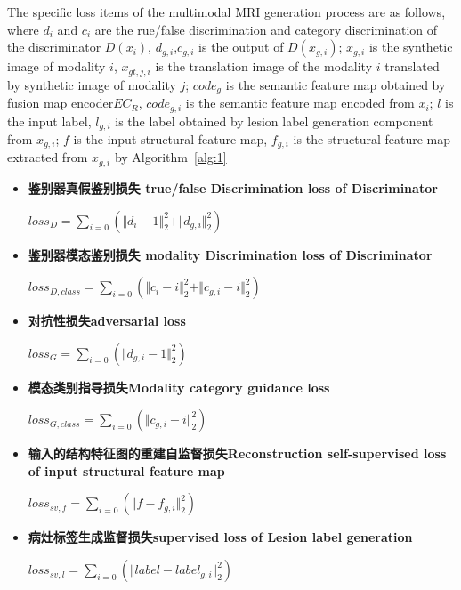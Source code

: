 \documentclass[letterpaper]{article} %
\begin{document}
The specific loss items of the multimodal MRI generation process are as follows, where $d_{i}$ and $c_{i}$ are the rue/false discrimination and category discrimination of the discriminator $D(x_i)$, $d_{g, i}$,$c_{g,i}$ is the output of $D(x_{g,i})$; $x_{g,i}$ is the synthetic image of modality $i$, $x_{gt,j,i}$ is the translation image of the modality $i$ translated by synthetic image of modality $j$; $code_g$ is the semantic feature map obtained by fusion map encoder$EC_R$, $code_{g,i}$ is the semantic feature map encoded from $x_i$; $l$ is the input label, $l_{g,i}$ is the label obtained by lesion label generation component from $x_{g,i}$; $f$ is the input structural feature map, $f_{g,i}$ is the structural feature map extracted from $x_{g,i}$ by Algorithm~\ref{alg:1}
\begin{itemize}
	\item \textbf{鉴别器真假鉴别损失 true/false Discrimination loss of Discriminator}
	\begin{center}
		$loss_{D}=\sum\limits_{i=0}(\Vert{d_{i}-1}\Vert_{2}^{2}+\Vert{d_{g,i}}\Vert_{2}^{2})$
	\end{center}

	\item \textbf{鉴别器模态鉴别损失 modality Discrimination loss of Discriminator}
	\begin{center}
	$loss_{D,class}=\sum\limits_{i=0}(\Vert{c_{i}-i}\Vert_{2}^{2}+\Vert{c_{g,i}-i}\Vert_{2}^{2})$
	\end{center}

	\item \textbf{对抗性损失adversarial loss}
	\begin{center}
		$loss_{G}=\sum\limits_{i=0}(\Vert{d_{g,i}-1}\Vert_{2}^{2})$
	\end{center}
	
	\item \textbf{模态类别指导损失Modality category guidance loss}
	\begin{center}
		$loss_{G,class}=\sum\limits_{i=0}(\Vert{c_{g,i}-i}\Vert_{2}^{2})$
	\end{center}
	
	\item \textbf{输入的结构特征图的重建自监督损失Reconstruction self-supervised loss of input structural feature map}
	\begin{center}
		$loss_{sv,f}=\sum\limits_{i=0}(\Vert{f-f_{g,i}}\Vert_{2}^{2})$
	\end{center}
	
	\item \textbf{病灶标签生成监督损失supervised loss of Lesion label generation }
	\begin{center}
		$loss_{sv,l}=\sum\limits_{i=0}(\Vert{label-label_{g,i}}\Vert_{2}^{2})$
	\end{center}
	

\end{itemize}
\end{document}
